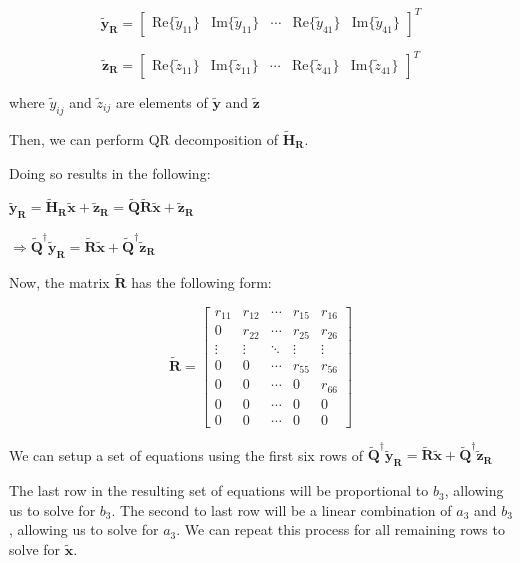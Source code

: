 \documentclass[fleqn]{article}
\begin{document}
\begin{enumerate}
\begin{enumerate}
			\begin{equation*}
				\mathbf{\tilde{y}_R} = \begin{bmatrix}
					\text{Re}\{\tilde{y}_{11}\} & \text{Im}\{\tilde{y}_{11}\} & \cdots & \text{Re}\{\tilde{y}_{41}\} & \text{Im}\{\tilde{y}_{41}\}
				\end{bmatrix}^T
			\end{equation*}
			
			\begin{equation*}
				\mathbf{\tilde{z}_R} = \begin{bmatrix}
					\text{Re}\{\tilde{z}_{11}\} & \text{Im}\{\tilde{z}_{11}\} & \cdots & \text{Re}\{\tilde{z}_{41}\} & \text{Im}\{\tilde{z}_{41}\}
				\end{bmatrix}^T
			\end{equation*}
			
			where $\tilde{y}_{ij}$ and $\tilde{z}_{ij}$ are elements of $\mathbf{\tilde{y}}$ and $\mathbf{\tilde{z}}$
			
			Then, we can perform QR decomposition of $\mathbf{\tilde{H}_R}$.
			
			Doing so results in the following:
			
			$\mathbf{\tilde{y}_R} = \mathbf{\tilde{H}_R\tilde{x}} + \mathbf{\tilde{z}_R} = \mathbf{\tilde{Q}\tilde{R}\tilde{x}} + \mathbf{\tilde{z}_R}$
			
			$\Rightarrow \mathbf{\tilde{Q}^{\dagger}\tilde{y}_R} = \mathbf{\tilde{R}\tilde{x}} + \mathbf{\tilde{Q}^{\dagger}\tilde{z}_R}$
			
			Now, the matrix $\mathbf{\tilde{R}}$ has the following form:
			
			\begin{equation*}
				\mathbf{\tilde{R}} = \begin{bmatrix}
					r_{11} & r_{12} & \cdots & r_{15} & r_{16} \\
					0 & r_{22} & \cdots & r_{25} & r_{26} \\ 
					\vdots & \vdots & \ddots & \vdots & \vdots \\
					0 & 0 & \cdots & r_{55} & r_{56} \\
					0 & 0 & \cdots & 0 & r_{66} \\
					0 & 0 & \cdots & 0 & 0 \\
					0 & 0 & \cdots & 0 & 0
				\end{bmatrix}
			\end{equation*}
			
			We can setup a set of equations using the first six rows of \newline $\mathbf{\tilde{Q}^{\dagger}\tilde{y}_R} = \mathbf{\tilde{R}\tilde{x}} + \mathbf{\tilde{Q}^{\dagger}\tilde{z}_R}$
			
			The last row in the resulting set of equations will be proportional to $b_3$, allowing us to solve for $b_3$. The second to last row will be a linear combination of $a_3$ and $b_3$, allowing us to solve for $a_3$. We can repeat this process for all remaining rows to solve for $\mathbf{\tilde{x}}$.
		\end{enumerate}		
	\end{enumerate}
\end{document}
